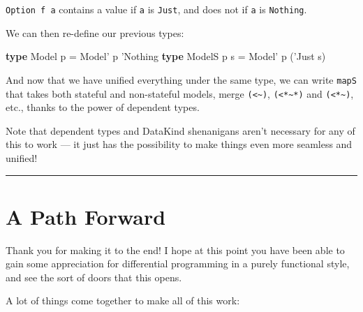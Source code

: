 \documentclass[]{article}
\newenvironment{Shaded}{}{}
\newcommand{\CharTok}[1]{\textcolor[rgb]{0.25,0.44,0.63}{#1}}
\newcommand{\DataTypeTok}[1]{\textcolor[rgb]{0.56,0.13,0.00}{#1}}
\newcommand{\FunctionTok}[1]{\textcolor[rgb]{0.02,0.16,0.49}{#1}}
\newcommand{\KeywordTok}[1]{\textcolor[rgb]{0.00,0.44,0.13}{\textbf{#1}}}
\newcommand{\NormalTok}[1]{#1}
\begin{document}
\texttt{Option\ f\ a} contains a value if \texttt{a} is
\texttt{\textquotesingle{}Just}, and does not if \texttt{a} is
\texttt{\textquotesingle{}Nothing}.

We can then re-define our previous types:

\begin{Shaded}
\begin{Highlighting}[]
\KeywordTok{type} \DataTypeTok{Model}\NormalTok{  p   }\FunctionTok{=} \DataTypeTok{Model'}\NormalTok{ p }\CharTok{'Nothing}
\KeywordTok{type} \DataTypeTok{ModelS}\NormalTok{ p s }\FunctionTok{=} \DataTypeTok{Model'}\NormalTok{ p (}\CharTok{'Just s)}
\end{Highlighting}
\end{Shaded}

And now that we have unified everything under the same type, we can write
\texttt{mapS} that takes both stateful and non-stateful models, merge
\texttt{(\textless{}\textasciitilde{})},
\texttt{(\textless{}*\textasciitilde{}*)} and
\texttt{(\textless{}*\textasciitilde{})}, etc., thanks to the power of dependent
types.

Note that dependent types and DataKind shenanigans aren't necessary for any of
this to work --- it just has the possibility to make things even more seamless
and unified!

\begin{center}\rule{0.5\linewidth}{\linethickness}\end{center}

\hypertarget{a-path-forward}{%
\section{A Path Forward}\label{a-path-forward}}

Thank you for making it to the end! I hope at this point you have been able to
gain some appreciation for differential programming in a purely functional
style, and see the sort of doors that this opens.

A lot of things come together to make all of this work:
\end{document}
